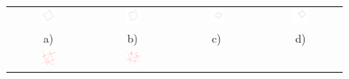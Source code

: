 \begin{figure}[h!]
\begin{tabular}{cccc}
     \includegraphics[width=0.2\textwidth]{img/problem_variability/problem_variability_1.png}
     &
     \includegraphics[width=0.2\textwidth]{img/problem_variability/problem_variability_2.png}&
     \includegraphics[width=0.2\textwidth]{img/problem_variability/problem_variability_3.png}
     &
     \includegraphics[width=0.2\textwidth]{img/problem_variability/problem_variability_4.png}
     \\
     a)  & b) & c) & d)
     \\
     \includegraphics[width=0.2\textwidth]{img/problem_variability/problem_variability_1_solved.png}
     &
     \includegraphics[width=0.2\textwidth]{img/problem_variability/problem_variability_2_solved.png}

\end{tabular}
\end{figure}
